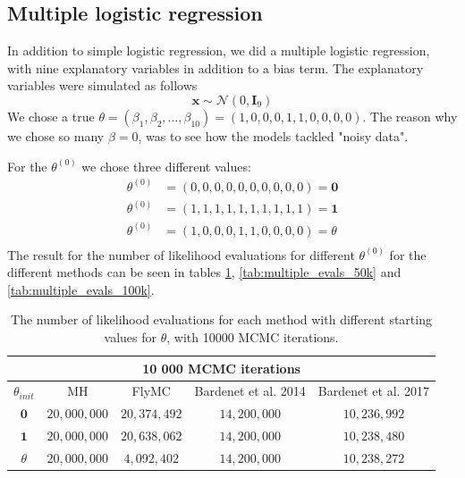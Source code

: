 \subsection{Multiple logistic regression}
In addition to simple logistic regression, we did a multiple logistic regression, with nine explanatory variables in addition to a bias term. The explanatory variables  
were simulated as follows
\begin{equation*}
    \mathbf{x} \sim \mathcal{N}\left(0,\mathbf{I}_9\right)
\end{equation*}
We chose a true $\theta = \left(\beta_1, \beta_2, \ldots, \beta_{10}\right) = \left(1, 0, 0 , 0, 1, 1, 0, 0, 0, 0\right)$. The reason why we chose so many $\beta = 0$, was to see how the models tackled "noisy data". 

For the $\theta^{\left(0\right)}$ we chose three different values: 
\begin{equation*}
\begin{split}
    \theta^{\left(0\right)} &= \left(0, 0, 0, 0, 0, 0, 0, 0, 0, 0\right) = \mathbf{0} \\
    \theta^{\left(0\right)} & = \left(1, 1, 1, 1, 1, 1, 1, 1, 1, 1 \right) = \mathbf{1} \\
    \theta^{\left(0\right)} & = \left(1, 0, 0, 0, 1, 1, 0, 0, 0, 0\right) = \theta \\
    \end{split}
\end{equation*}
The result for the number of likelihood evaluations for different $\theta^{\left(0\right)}$ for the different methods can be seen in tables \ref{tab:multiple_evals_10k}, \ref{tab:multiple_evals_50k} and \ref{tab:multiple_evals_100k}. 

\begin{table}
    \centering
\begin{tabular}{|c|c|c|c|c|}
  \hline
    \multicolumn{5}{|c|}{10 000 MCMC iterations} \\
    \hline
\hline

        $\theta_{init}$ &  MH & FlyMC & Bardenet et al. 2014 & Bardenet et al. 2017\\ 
         \hline \hline$\mathbf{0}$ & $20,000,000$ & $20,374,492$ & $14,200,000$ & $10,236,992$ \\
        $\mathbf{1}$ & $20,000,000$ & $20,638,062$ & $14,200,000$ & $10,238,480$ \\
        $\theta$ & $20,000,000$ & $4,092,402$ & $14,200,000$ & $10,238,272$
       
        \\ \hline
\end{tabular}
\caption{The number of likelihood evaluations for each method with different starting values for $\theta$, with 10000 MCMC iterations.}
\label{tab:multiple_evals_10k}
\end{table} 

